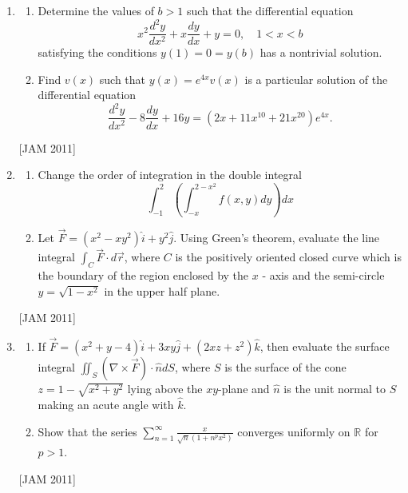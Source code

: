 \begin{enumerate}
\item  

\begin{enumerate}
    \item Determine the values of $b>1$ such that the differential equation
$$
x^{2} \frac{d^{2} y}{d x^{2}}+x \frac{d y}{d x}+y=0, \quad 1<x<b
$$
satisfying the conditions $y(1)=0=y(b)$ has a nontrivial solution.

\item  Find $v(x)$ such that $y(x)=e^{4 x} v(x)$ is a particular solution of the differential equation
$$
\frac{d^{2} y}{d x^{2}}-8 \frac{d y}{d x}+16 y=\left(2 x+11 x^{10}+21 x^{20}\right) e^{4 x} .
$$
\end{enumerate}
\hfill [JAM 2011]



\item 
\begin{enumerate}
    
  \item Change the order of integration in the double integral
$$
\int_{-1}^{2}\left(\int_{-x}^{2-x^{2}} f(x, y) d y\right) d x
$$
\item  Let $\vec{F}=\left(x^{2}-x y^{2}\right) \hat{i}+y^{2} \hat{j}$. Using Green's theorem, evaluate the line integral $\int_{C} \vec{F} \cdot d \vec{r}$, where $C$ is the positively oriented closed curve which is the boundary of the region enclosed by the $x$ - axis and the semi-circle $y=\sqrt{1-x^{2}}$ in the upper half plane.

\end{enumerate}
\hfill [JAM 2011]




\item 
\begin{enumerate}
    
\item  If $\vec{F}=\left(x^{2}+y-4\right) \hat{i}+3 x y \hat{j}+\left(2 x z+z^{2}\right) \hat{k}$, then evaluate the surface integral $\iint_{S}(\nabla \times \vec{F}) \cdot \hat{n} d S$, where $S$ is the surface of the cone $z=1-\sqrt{x^{2}+y^{2}}$ lying above the $x y$-plane and $\hat{n}$ is the unit normal to $S$ making an acute angle with $\hat{k}$.

\item  Show that the series $\sum_{n=1}^{\infty} \frac{x}{\sqrt{n}\left(1+n^{p} x^{2}\right)}$ converges uniformly on $\mathbb{R}$ for $p>1$.
\end{enumerate}
\hfill [JAM 2011]



\end{enumerate}
